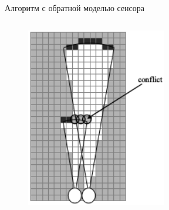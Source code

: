 \documentclass[9pt]{beamer}
\begin{document}
\begin{frame}{Алгоритм с обратной моделью сенсора}
\begin{columns}
\begin{column}{0.33\textwidth}
\begin{figure}[h]
    \includegraphics[width=0.9\textwidth]{inv2.png}
\end{figure}
\end{column}
\begin{column}{0.33\textwidth}
  \begin{figure}[h]
    \centering

\end{figure}
\end{column}
\end{columns}
\end{frame}
\end{document}
